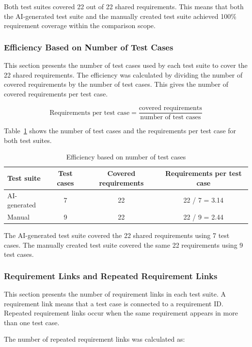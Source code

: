 \documentclass[a4paper,12pt]{article}
\begin{document}
Both test suites covered 22 out of 22 shared requirements. This means that both the AI-generated test suite and the manually created test suite achieved 100\% requirement coverage within the comparison scope.

\subsubsection{Efficiency Based on Number of Test Cases}
This section presents the number of test cases used by each test suite to cover the 22 shared requirements. The efficiency was calculated by dividing the number of covered requirements by the number of test cases. This gives the number of covered requirements per test case.

\[
\text{Requirements per test case} = \frac{\text{covered requirements}}{\text{number of test cases}}
\]

Table~\ref{tab:testcase_efficiency} shows the number of test cases and the requirements per test case for both test suites.

\begin{table}[H]
\centering
\caption{Efficiency based on number of test cases}
\label{tab:testcase_efficiency}
\begin{tabular}{lccc}
\toprule
\textbf{Test suite} & \textbf{Test cases} & \textbf{Covered requirements} & \textbf{Requirements per test case} \\
\midrule
AI-generated & 7 & 22 & 22 / 7 = 3.14 \\
Manual & 9 & 22 & 22 / 9 = 2.44 \\
\bottomrule
\end{tabular}
\end{table}

The AI-generated test suite covered the 22 shared requirements using 7 test cases. The manually created test suite covered the same 22 requirements using 9 test cases.

\subsubsection{Requirement Links and Repeated Requirement Links}
This section presents the number of requirement links in each test suite. A requirement link means that a test case is connected to a requirement ID. Repeated requirement links occur when the same requirement appears in more than one test case.

The number of repeated requirement links was calculated as:
\end{document}
